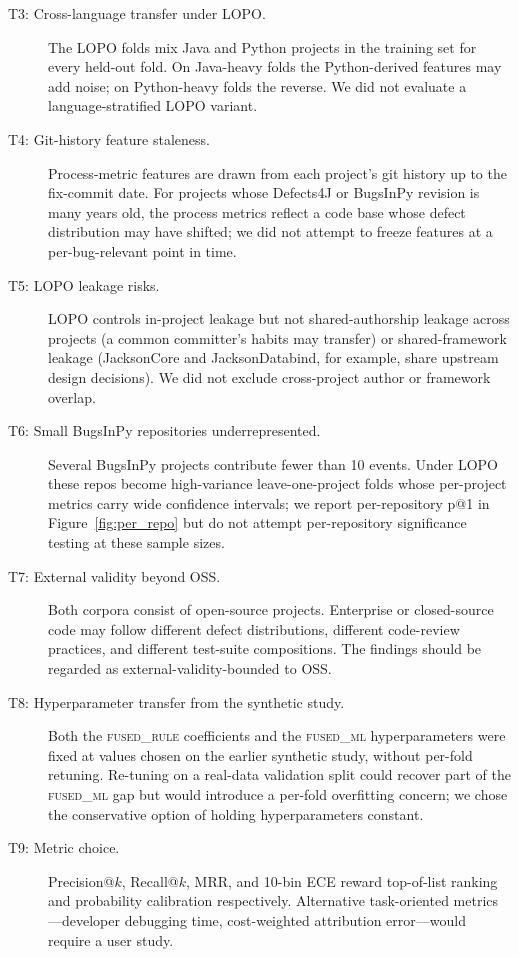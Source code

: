 \documentclass[preprint,12pt]{elsarticle}
\begin{document}
\begin{description}
\item[T3: Cross-language transfer under LOPO.] The LOPO folds mix Java and Python projects in the training set for every held-out fold. On Java-heavy folds the Python-derived features may add noise; on Python-heavy folds the reverse. We did not evaluate a language-stratified LOPO variant.

\item[T4: Git-history feature staleness.] Process-metric features are drawn from each project's git history up to the fix-commit date. For projects whose Defects4J or BugsInPy revision is many years old, the process metrics reflect a code base whose defect distribution may have shifted; we did not attempt to freeze features at a per-bug-relevant point in time.

\item[T5: LOPO leakage risks.] LOPO controls in-project leakage but not shared-authorship leakage across projects (a common committer's habits may transfer) or shared-framework leakage (JacksonCore and JacksonDatabind, for example, share upstream design decisions). We did not exclude cross-project author or framework overlap.

\item[T6: Small BugsInPy repositories underrepresented.] Several BugsInPy projects contribute fewer than 10 events. Under LOPO these repos become high-variance leave-one-project folds whose per-project metrics carry wide confidence intervals; we report per-repository p@1 in Figure~\ref{fig:per_repo} but do not attempt per-repository significance testing at these sample sizes.

\item[T7: External validity beyond OSS.] Both corpora consist of open-source projects. Enterprise or closed-source code may follow different defect distributions, different code-review practices, and different test-suite compositions. The findings should be regarded as external-validity-bounded to OSS.

\item[T8: Hyperparameter transfer from the synthetic study.] Both the \textsc{fused\_rule} coefficients and the \textsc{fused\_ml} hyperparameters were fixed at values chosen on the earlier synthetic study, without per-fold retuning. Re-tuning on a real-data validation split could recover part of the \textsc{fused\_ml} gap but would introduce a per-fold overfitting concern; we chose the conservative option of holding hyperparameters constant.

\item[T9: Metric choice.] Precision@$k$, Recall@$k$, MRR, and 10-bin ECE reward top-of-list ranking and probability calibration respectively. Alternative task-oriented metrics---developer debugging time, cost-weighted attribution error---would require a user study.


\end{description}
\end{document}
